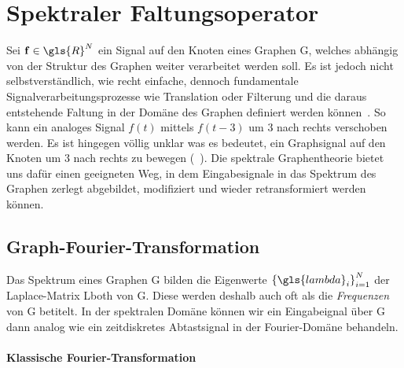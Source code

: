\section{Spektraler Faltungsoperator}
\label{spektraler_faltungsoperator}

Sei $\ve{f} \in \gls{R}^N$ ein Signal auf den Knoten eines Graphen \gls{G}, welches abhängig von der Struktur des Graphen weiter verarbeitet werden soll.
Es ist jedoch nicht selbstverständlich, wie recht einfache, dennoch fundamentale Signalverarbeitungsprozesse wie Translation oder Filterung und die daraus entstehende Faltung in der Domäne des Graphen definiert werden können~\cite{Shuman}.
So kann \zB{} ein analoges Signal $f\left(t\right)$ mittels $f\left(t-3\right)$ um $3$ nach rechts verschoben werden.
Es ist hingegen völlig unklar was es bedeutet, ein Graphsignal auf den Knoten um $3$ nach rechts zu bewegen (\vgl{}~\cite{Shuman}).
Die spektrale Graphentheorie bietet uns dafür einen geeigneten Weg, in dem Eingabesignale in das Spektrum des Graphen zerlegt \bzw{} abgebildet, modifiziert und wieder retransformiert werden können.

\subsection{Graph-Fourier-Transformation}
\label{graph_fourier_transformation}

Das Spektrum eines Graphen \gls{G} bilden die Eigenwerte ${\left\{\gls{lambda}_i\right\}}_{i=1}^N$ der Laplace-Matrix \gls{Lboth} von \gls{G}.
Diese werden deshalb auch oft als die \emph{Frequenzen} von \gls{G} betitelt.
In der spektralen Domäne können wir ein Eingabeignal  über \gls{G} dann analog wie ein zeitdiskretes Abtastsignal in der Fourier-Domäne behandeln.

\paragraph{Klassische Fourier-Transformation}
\label{klassische_fourier_transformation}


